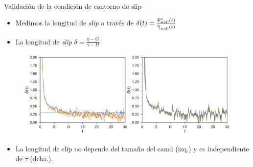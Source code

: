 \documentclass{beamer}
\begin{document}
\begin{frame}{Validación de la condición de contorno de slip}
  \begin{itemize}
    \item Medimos la longitud de \textit{slip} a través de 
 $\delta(t)=\frac{\overline{\bf v}^x_{\rm wall}(t)}{\dot{\overline{\gamma}}_{\rm wall}(t)}$
\item La longitud de \textit{slip} 
  $\delta =\frac{\eta -G}{\gamma-H}$
  \end{itemize}
  \begin{figure}[]
\includegraphics[width=\linewidth]{Slipt-17nodes-WALLS}
  \end{figure}
  \begin{itemize}
    \item La longitud de slip no depende del tamaño del canal (izq.) y es independiente de $\tau$ (dcha.).
  \end{itemize}
\end{frame}
\end{document}
